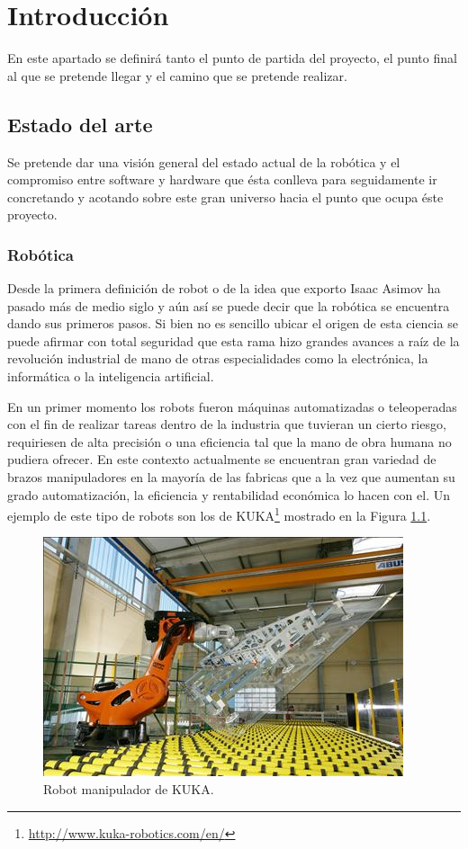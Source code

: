 \documentclass[12pt,a4paper,final,twoside]{book}
\begin{document}
\chapter{Introducción}
\thispagestyle{fancy}
En este apartado se definirá tanto el punto de partida del proyecto, el punto final al que se pretende llegar y el camino que se pretende realizar. 
 
\section{Estado del arte}\label{estatdelart}
Se pretende dar una visión general del estado actual de la robótica y el compromiso entre software y hardware que ésta conlleva para seguidamente ir concretando y acotando sobre este gran universo hacia el punto que ocupa éste proyecto. 

\subsection{Robótica}

Desde la primera definición de robot o de la idea que exporto Isaac Asimov ha pasado más de medio siglo y aún así se puede decir que la robótica se encuentra dando sus primeros pasos. Si bien no es sencillo ubicar el origen de esta ciencia se puede afirmar con total seguridad que esta rama hizo grandes avances a raíz de la revolución industrial de mano de otras especialidades como la electrónica, la informática o la inteligencia artificial.

En un primer momento los robots fueron máquinas automatizadas o teleoperadas con el fin de realizar tareas dentro de la industria que tuvieran un cierto riesgo, requiriesen de alta precisión o una eficiencia tal que la mano de obra humana no pudiera ofrecer. En este contexto actualmente se encuentran gran variedad de brazos manipuladores en la mayoría de las fabricas que a la vez que aumentan su grado automatización, la eficiencia y rentabilidad económica lo hacen con el\cite{libroblanco}. Un ejemplo de este tipo de robots son los de KUKA\footnote{\url{http://www.kuka-robotics.com/en/}} mostrado en la Figura \ref{fig:kuka}.
 
\begin{figure}[h!]
	\centering
    \includegraphics[scale=3]	{images/kuka.jpg}
	 \caption{Robot manipulador de KUKA.}
  \label{fig:kuka}
\end{figure}
\end{document}
